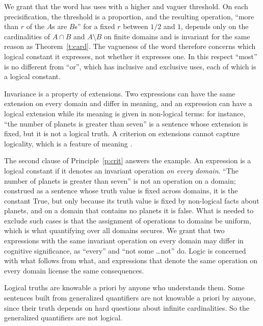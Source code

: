 \documentclass{situationist-preprint}
\begin{document}
\begin{reply}
We grant that the word has uses with a higher and vaguer threshold. On each precisification, the threshold is a proportion, and the resulting operation, \enquote{more than $r$ of the $A$s are $B$s} for a fixed $r$ between $1/2$ and $1$, depends only on the cardinalities of $A \cap B$ and $A \setminus B$ on finite domains and is invariant for the same reason as Theorem~\ref{t:card}. The vagueness of the word therefore concerns which logical constant it expresses, not whether it expresses one. In this respect \enquote{most} is no different from \enquote{or}, which has inclusive and exclusive uses, each of which is a logical constant.
\end{reply}

\begin{objection}[Undergeneration]
Invariance is a property of extensions. Two expressions can have the same extension on every domain and differ in meaning, and an expression can have a logical extension while its meaning is given in non-logical terms: for instance, \enquote{the number of planets is greater than seven} is a sentence whose extension is fixed, but it is not a logical truth. A criterion on extensions cannot capture logicality, which is a feature of meaning \citep{McCarthy1981,DutilhNovaes2014}.
\end{objection}

\begin{reply}
The second clause of Principle~\ref{p:crit} answers the example. An expression is a logical constant if it denotes an invariant operation \emph{on every domain}. \enquote{The number of planets is greater than seven} is not an operation on a domain; construed as a sentence whose truth value is fixed across domains, it is the constant True, but only because its truth value is fixed by non-logical facts about planets, and on a domain that contains no planets it is false. What is needed to exclude such cases is that the assignment of operations to domains be uniform, which is what quantifying over all domains secures. We grant that two expressions with the same invariant operation on every domain may differ in cognitive significance, as \enquote{every} and \enquote{not some \ldots not} do. Logic is concerned with what follows from what, and expressions that denote the same operation on every domain license the same consequences.
\end{reply}

\begin{objection}[Epistemology]
Logical truths are knowable a priori by anyone who understands them. Some sentences built from generalized quantifiers are not knowable a priori by anyone, since their truth depends on hard questions about infinite cardinalities. So the generalized quantifiers are not logical.
\end{objection}
\end{document}
